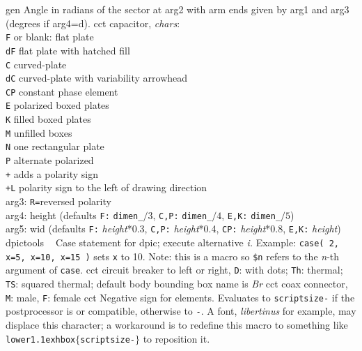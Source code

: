 %
%
  {gen}%
  {Angle in radians of the sector at arg2 with arm ends given
   by arg1 and arg3 (degrees if arg4=d).}%
%
  {cct}%
  {capacitor, {\sl chars}:\\
    {\tt F} or blank: flat plate\\
    {\tt dF} flat plate with hatched fill\\
    {\tt C} curved-plate\\
    {\tt dC} curved-plate with variability arrowhead\\
    {\tt CP} constant phase element\\
    {\tt E} polarized boxed plates\\
    {\tt K} filled boxed plates\\
    {\tt M} unfilled boxes\\
    {\tt N} one rectangular plate\\
    {\tt P} alternate polarized\\
    {\tt +} adds a polarity sign\\
    {\tt +L} polarity sign to the left of drawing direction\\
    arg3:  {\tt R=}reversed polarity\\
    arg4: height (defaults {\tt F:} {\tt dimen\_}$/3$,
      {\tt C,P:} {\tt dimen\_}$/4$,
      {\tt E,K:} {\tt dimen\_}$/5$)\\
    arg5: wid (defaults {\tt F:} {\sl height}*0.3,
      {\tt C,P:} {\sl height}*0.4,
      {\tt CP:} {\sl height}*0.8,
      {\tt E,K:} {\sl height})
    }%
%
  {dpictools}%
  {$\;\;$ Case statement for dpic; execute alternative {\sl i.}
   Example: {\tt case( 2, x=5, x=10, x=15 )} sets {\tt x} to 10.
   Note: this is a macro so {\tt \${}n} refers to the {\sl n}-th
	 argument of {\tt case}.}%
%
  {cct}%
  {circuit breaker to left or right, {\tt D}: with dots; {\tt Th}: thermal;
   {\tt TS}: squared thermal; default body bounding box name is
     {\sl Br}}%
%
  {cct}%
  {coax connector, {\tt M}: male, {\tt F}: female
    }%
%
  {cct}%
  {Negative sign for elements. Evaluates to
   {\tt \bsl{}scriptsize-} if the
   postprocessor is \latex or compatible,
   otherwise to {\tt -}.
   A font, {\sl libertinus} for example, may displace this character; a
   workaround is to redefine this macro to something like
   {\tt \bsl{}lower1.1ex\bsl{}hbox$\lbrace$\bsl{}scriptsize-$\rbrace$}
   to reposition it.}%

